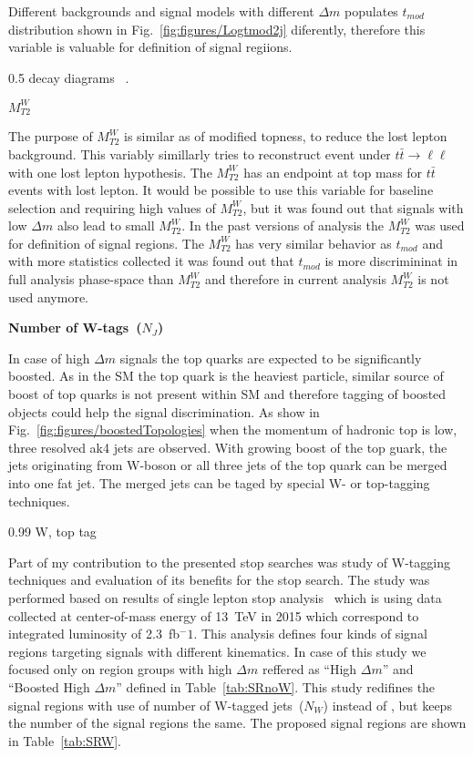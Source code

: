 Different backgrounds and signal models with different $\Delta m$ populates $t_{mod}$ distribution shown in Fig.~\ref{fig:figures/Logtmod2j} diferently, therefore this variable is valuable for definition of signal regiions.

                 {0.5}       %
                 { decay diagrams ~\cite{website:stopSupp}. }

\textbf{$M_{T2}^{W}$}

The purpose of $M_{T2}^{W}$ is similar as of modified topness, to reduce the lost lepton background. This variably simillarly tries to reconstruct event under $t \bar{t} \to \ell \ell$ with one lost lepton hypothesis. The $M_{T2}^{W}$ has an endpoint at top mass for $t\bar{t}$ events with lost lepton. It would be possible to use this variable for baseline selection and requiring high values of $M_{T2}^{W}$, but it was found out that signals with low $\Delta m$ also lead to small $M_{T2}^{W}$. In the past versions of analysis the $M_{T2}^{W}$ was used for definition of signal regions. The $M_{T2}^{W}$ has very similar behavior as $t_{mod}$ and with more statistics collected it was found out that $t_{mod}$ is more discrimininat in full analysis phase-space than $M_{T2}^{W}$ and therefore in current analysis $M_{T2}^{W}$ is not used anymore.

\textbf{Number of W-tags~($N_{J}$)}

In case of high  $\Delta m$ signals the top quarks are expected to be significantly boosted. As in the SM the top quark is the heaviest particle, similar source of boost of top quarks is not present within SM and therefore tagging of boosted objects could help the signal discrimination. As show in Fig.~\ref{fig:figures/boostedTopologies} when the momentum of hadronic top is low, three resolved ak4 jets are observed. With growing boost of the top guark, the jets originating from W-boson or all three jets of the top quark can be merged into one fat jet. The merged jets can be taged by special W- or top-tagging techniques.

                 {0.99}       %
                 { W, top tag }


Part of my contribution to the presented stop searches was study of W-tagging techniques and evaluation of its benefits for the stop search. The study was performed based on results of single lepton stop analysis~\cite{Sirunyan:2016jpr} which is using data collected at center-of-mass energy of 13~TeV in 2015 which correspond to integrated luminosity of 2.3~fb$^-1$. This analysis defines four kinds of signal regions targeting signals with different kinematics. In case of this study we focused only on region groups with high $\Delta m $ reffered as ``High $\Delta m$'' and ``Boosted High $\Delta m$'' defined in Table~\ref{tab:SRnoW}. This study redifines the signal regions with use of number of W-tagged jets~($N_{W}$) instead of \MET, but keeps the number of the signal regions the same. The proposed signal regions are shown in Table~\ref{tab:SRW}.

